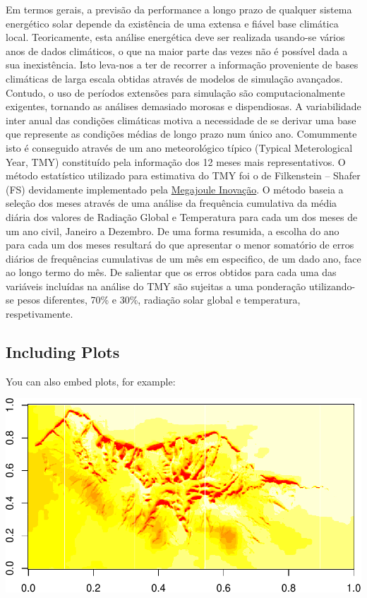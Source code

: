 \documentclass[]{article}
\begin{document}
Em termos gerais, a previsão da performance a longo prazo de qualquer
sistema energético solar depende da existência de uma extensa e fiável
base climática local. Teoricamente, esta análise energética deve ser
realizada usando-se vários anos de dados climáticos, o que na maior
parte das vezes não é possível dada a sua inexistência. Isto leva-nos a
ter de recorrer a informação proveniente de bases climáticas de larga
escala obtidas através de modelos de simulação avançados. Contudo, o uso
de períodos extensões para simulação são computacionalmente exigentes,
tornando as análises demasiado morosas e dispendiosas. A variabilidade
inter anual das condições climáticas motiva a necessidade de se derivar
uma base que represente as condições médias de longo prazo num único
ano. Comummente isto é conseguido através de um ano meteorológico típico
(Typical Meterological Year, TMY) constituído pela informação dos 12
meses mais representativos. O método estatístico utilizado para
estimativa do TMY foi o de Filkenstein -- Shafer (FS) devidamente
implementado pela \href{http://megajoule.pt}{Megajoule Inovação}. O
método baseia a seleção dos meses através de uma análise da frequência
cumulativa da média diária dos valores de Radiação Global e Temperatura
para cada um dos meses de um ano civil, Janeiro a Dezembro. De uma forma
resumida, a escolha do ano para cada um dos meses resultará do que
apresentar o menor somatório de erros diários de frequências cumulativas
de um mês em especifico, de um dado ano, face ao longo termo do mês. De
salientar que os erros obtidos para cada uma das variáveis incluídas na
análise do TMY são sujeitas a uma ponderação utilizando-se pesos
diferentes, 70\% e 30\%, radiação solar global e temperatura,
respetivamente.

\subsection{Including Plots}\label{including-plots}

You can also embed plots, for example:

\begin{center}\includegraphics{static_files/figure-latex/pressure-1} \end{center}
\end{document}
